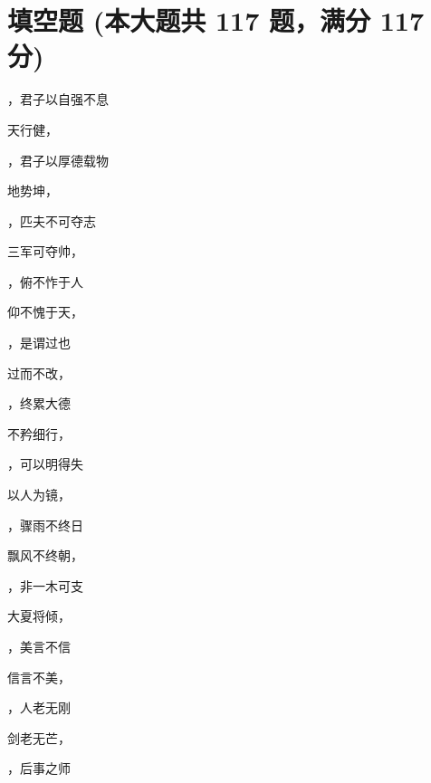 \documentclass[12pt, a4paper, addpoints]{exam}
\begin{document}
\hspace{5cm}

\section{\normalsize{填空题 (本大题共 117 题，满分 117 分)}}
\hspace{1.5cm}
\begin{multicols}{2}
\begin{questions}
\question[1] \uline{\qquad\qquad\qquad}，君子以自强不息

\question[1] 天行健，\uline{\qquad\qquad\qquad}

\question[1] \uline{\qquad\qquad\qquad}，君子以厚德载物

\question[1] 地势坤，\uline{\qquad\qquad\qquad}

\question[1] \uline{\qquad\qquad\qquad}，匹夫不可夺志

\question[1] 三军可夺帅，\uline{\qquad\qquad\qquad}

\question[1] \uline{\qquad\qquad\qquad}，俯不怍于人

\question[1] 仰不愧于天，\uline{\qquad\qquad\qquad}

\question[1] \uline{\qquad\qquad\qquad}，是谓过也

\question[1] 过而不改，\uline{\qquad\qquad\qquad}

\question[1] \uline{\qquad\qquad\qquad}，终累大德

\question[1] 不矜细行，\uline{\qquad\qquad\qquad}

\question[1] \uline{\qquad\qquad\qquad}，可以明得失

\question[1] 以人为镜，\uline{\qquad\qquad\qquad}

\question[1] \uline{\qquad\qquad\qquad}，骤雨不终日

\question[1] 飘风不终朝，\uline{\qquad\qquad\qquad}

\question[1] \uline{\qquad\qquad\qquad}，非一木可支

\question[1] 大夏将倾，\uline{\qquad\qquad\qquad}

\question[1] \uline{\qquad\qquad\qquad}，美言不信

\question[1] 信言不美，\uline{\qquad\qquad\qquad}

\question[1] \uline{\qquad\qquad\qquad}，人老无刚

\question[1] 剑老无芒，\uline{\qquad\qquad\qquad}

\question[1] \uline{\qquad\qquad\qquad}，后事之师


\end{questions}
\end{multicols}
\end{document}
